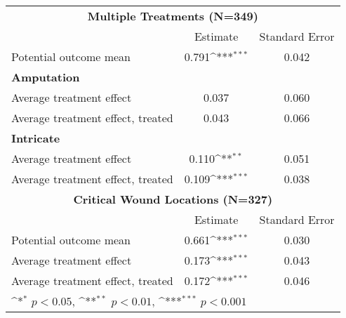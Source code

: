 \def\sym#1{\ifmmode^{#1}\else\(^{#1}\)\fi}
\begin{tabular}{lcc} \hline \hline
                                  \multicolumn{3}{c}{\textbf{Multiple Treatments (N=349)}} \\
                                  &  Estimate & Standard Error      \\ \hline                                  
Potential outcome mean            & 0.791\sym{***}     & 0.042      \\
\multicolumn{3}{l}{\textbf{Amputation}}                             \\
Average treatment effect          & 0.037              & 0.060      \\
Average treatment effect, treated & 0.043              & 0.066      \\
\multicolumn{3}{l}{\textbf{Intricate}}                              \\
Average treatment effect          & 0.110\sym{**}     & 0.051       \\
Average treatment effect, treated & 0.109\sym{***}    & 0.038       \\ \hline \hline
                                  \multicolumn{3}{c}{\textbf{Critical Wound Locations (N=327)}} \\ 
                                  & Estimate & Standard Error       \\ \hline
Potential outcome mean            & 0.661\sym{***}     & 0.030      \\
Average treatment effect          & 0.173\sym{***}     & 0.043      \\
Average treatment effect, treated & 0.172\sym{***}     & 0.046      \\ \hline                            
\multicolumn{3}{l}{\footnotesize \sym{*} \(p<0.05\), \sym{**} \(p<0.01\), \sym{***} \(p<0.001\)}\\
\hline \hline
\end{tabular}